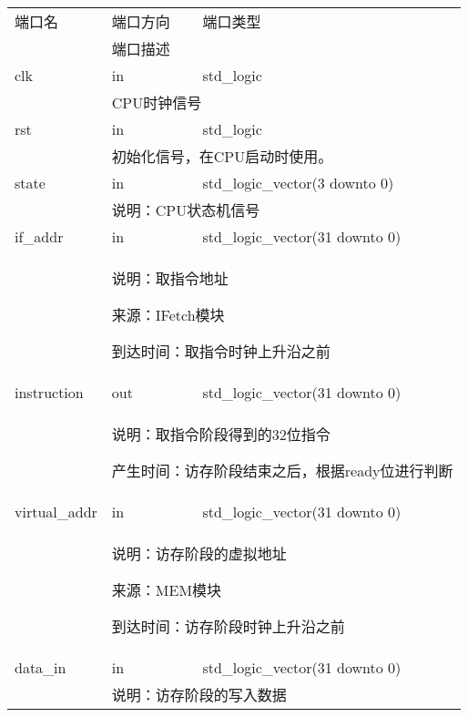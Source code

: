         \begin{tabularx}{\textwidth}{lll}
            \toprule
            端口名          & 端口方向  & 端口类型 \\
            \cmidrule(l){2-3}
            &
            \multicolumn{2}{X}{端口描述} \\
            \midrule
            clk             & in        & std\_logic \\
            \cmidrule(l){2-3}
            &
            \multicolumn{2}{X}{
                CPU时钟信号
            } \\
            \midrule
            rst             & in        & std\_logic \\
            \cmidrule(l){2-3}
            &
            \multicolumn{2}{X}{
                初始化信号，在CPU启动时使用。
            } \\
            \midrule
            state           & in        & std\_logic\_vector(3 downto 0) \\
            \cmidrule(l){2-3}
            &
            \multicolumn{2}{X}{
                说明：CPU状态机信号
            } \\
            \midrule
            if\_addr        & in        & std\_logic\_vector(31 downto 0) \\
            \cmidrule(l){2-3}
            &
            \multicolumn{2}{X}{
                说明：取指令地址

                来源：IFetch模块

                到达时间：取指令时钟上升沿之前
            } \\
            \midrule
            instruction        & out        & std\_logic\_vector(31 downto 0) \\
            \cmidrule(l){2-3}
            &
            \multicolumn{2}{X}{
                说明：取指令阶段得到的32位指令

                产生时间：访存阶段结束之后，根据ready位进行判断
            } \\
            \midrule
            virtual\_addr & in      & std\_logic\_vector(31 downto 0) \\
            \cmidrule(l){2-3}
            &
            \multicolumn{2}{X}{
                说明：访存阶段的虚拟地址

                来源：MEM模块

                到达时间：访存阶段时钟上升沿之前
            } \\
            \midrule
            data\_in & in     & std\_logic\_vector(31 downto 0) \\
            \cmidrule(l){2-3}
            &
            \multicolumn{2}{X}{
                说明：访存阶段的写入数据

}
\end{tabularx}
